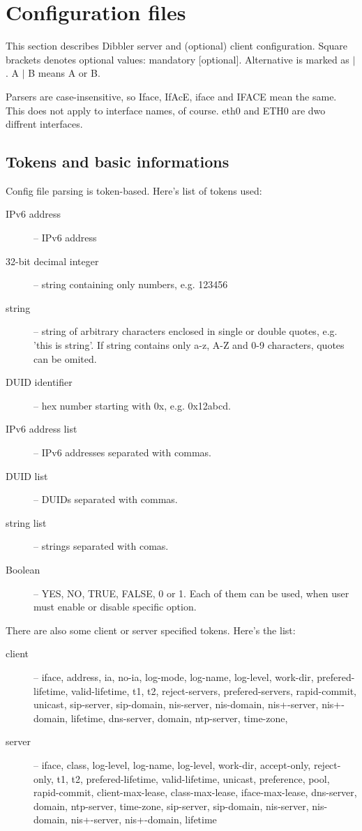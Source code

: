 
\section{Configuration files}

This section describes Dibbler server and (optional) client
configuration. Square brackets denotes optional values: mandatory
[optional]. Alternative is marked as $\mid$. A $\mid$ B means A or B.

Parsers are case-insensitive, so Iface, IfAcE, iface and IFACE mean the
same. This does not apply to interface names, of course. eth0 and ETH0
are dwo diffrent interfaces.

\subsection{Tokens and basic informations}
Config file parsing is token-based. Here's list of tokens used:
\begin{description}
\item[IPv6 address] -- IPv6 address 
\item[32-bit decimal integer] -- string containing only numbers, e.g. 123456
\item[string] -- string of arbitrary characters enclosed in single or double
  quotes, e.g. 'this is string'. If string contains only a-z, A-Z and
  0-9 characters, quotes can be omited.
\item[DUID identifier] -- hex number starting with 0x, e.g. 0x12abcd.
\item[IPv6 address list] -- IPv6 addresses separated with commas.
\item[DUID list] -- DUIDs separated with commas.
\item[string list] -- strings separated with comas.
\item[Boolean] -- YES, NO, TRUE, FALSE, 0 or 1. Each of them can be
  used, when user must enable or disable specific option.
\end{description}

There are also some client or server specified tokens. Here's the list:
\begin{description}
\item[client] -- iface, address, ia, no-ia, log-mode, log-name,
  log-level, work-dir, prefered-lifetime, valid-lifetime, t1, t2,
  reject-servers, prefered-servers, rapid-commit, unicast, sip-server,
  sip-domain, nis-server, nis-domain, nis+-server, nis+-domain,
  lifetime, dns-server, domain, ntp-server, time-zone,

\item[server] -- iface, class, log-level, log-name, log-level,
  work-dir, accept-only, reject-only, t1, t2, prefered-lifetime,
  valid-lifetime, unicast, preference, pool, rapid-commit,
  client-max-lease, class-max-lease, iface-max-lease, dns-server,
  domain, ntp-server, time-zone, sip-server, sip-domain, nis-server,
  nis-domain, nis+-server, nis+-domain, lifetime
\end{description}

